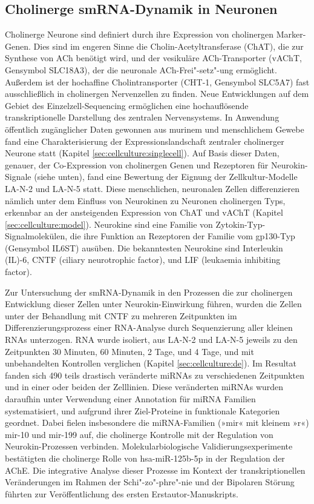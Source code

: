 \subsection{Cholinerge smRNA-Dynamik in Neuronen}
Cholinerge Neurone sind definiert durch ihre Expression von cholinergen Marker-Genen. Dies sind im engeren Sinne die Cholin-Acetyltransferase (ChAT), die zur Synthese von ACh benötigt wird, und der vesikuläre ACh-Transporter (vAChT, Gensymbol SLC18A3), der die neuronale ACh-Frei"-setz"-ung ermöglicht. Außerdem ist der hochaffine Cholintransporter (CHT-1, Gensymbol SLC5A7) fast ausschließlich in cholinergen Nervenzellen zu finden. Neue Entwicklungen auf dem Gebiet des Einzelzell-Sequencing ermöglichen eine hochauflösende transkriptionelle Darstellung des zentralen Nervensystems. In Anwendung öffentlich zugänglicher Daten gewonnen aus murinem und menschlichem Gewebe fand eine Charakterisierung der Expressionslandschaft zentraler cholinerger Neurone statt (Kapitel \ref{sec:cellculture:singlecell}). Auf Basis dieser Daten, genauer, der Co-Expression von cholinergen Genen und Rezeptoren für Neurokin-Signale (siehe unten), fand eine Bewertung der Eignung der Zellkultur-Modelle LA-N-2 und LA-N-5 statt. Diese menschlichen, neuronalen Zellen differenzieren nämlich unter dem Einfluss von Neurokinen zu Neuronen cholinergen Typs, erkennbar an der ansteigenden Expression von ChAT und vAChT (Kapitel \ref{sec:cellculture:model}). Neurokine sind eine Familie von Zytokin-Typ-Signalmolekülen, die ihre Funktion an Rezeptoren der Familie vom gp130-Typ (Gensymbol IL6ST) ausüben. Die bekanntesten Neurokine sind Interleukin (IL)-6, CNTF (ciliary neurotrophic factor), und LIF (leukaemia inhibiting factor).

Zur Untersuchung der smRNA-Dynamik in den Prozessen die zur cholinergen Entwicklung dieser Zellen unter Neurokin-Einwirkung führen, wurden die Zellen unter der Behandlung mit CNTF zu mehreren Zeitpunkten im Differenzierungsprozess einer RNA-Analyse durch Sequenzierung aller kleinen RNAs unterzogen. RNA wurde isoliert, aus LA-N-2 und LA-N-5 jeweils zu den Zeitpunkten 30 Minuten, 60 Minuten, 2 Tage, und 4 Tage, und mit unbehandelten Kontrollen verglichen (Kapitel \ref{sec:cellculture:de}). Im Resultat fanden sich 490 teils drastisch veränderte miRNAs zu verschiedenen Zeitpunkten und in einer oder beiden der Zelllinien. Diese veränderten miRNAs wurden daraufhin unter Verwendung einer Annotation für miRNA Familien systematisiert, und aufgrund ihrer Ziel-Proteine in funktionale Kategorien geordnet. Dabei fielen insbesondere die miRNA-Familien (»mir« mit kleinem »r«) mir-10 und mir-199 auf, die cholinerge Kontrolle mit der Regulation von Neurokin-Prozessen verbinden. Molekularbiologische Validierungsexperimente bestätigten die cholinerge Rolle von hsa-miR-125b-5p in der Regulation der AChE. Die integrative Analyse dieser Prozesse im Kontext der transkriptionellen Veränderungen im Rahmen der Schi"-zo"-phre"-nie und der Bipolaren Störung führten zur Veröffentlichung des ersten Erstautor-Manuskripts.\cite{Lobentanzer2019a}

